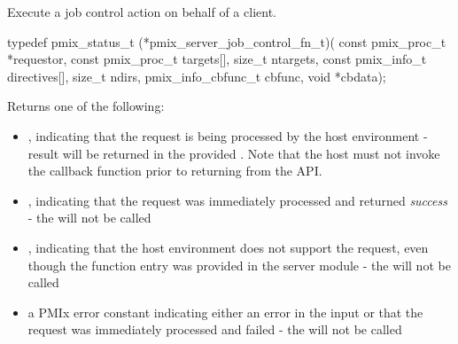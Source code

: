 \summary

Execute a job control action on behalf of a client.

\format

\cspecificstart
\begin{codepar}
typedef pmix_status_t (*pmix_server_job_control_fn_t)(
                             const pmix_proc_t *requestor,
                             const pmix_proc_t targets[],
                             size_t ntargets,
                             const pmix_info_t directives[],
                             size_t ndirs,
                             pmix_info_cbfunc_t cbfunc,
                             void *cbdata);
\end{codepar}
\cspecificend

\begin{arglist}
\end{arglist}

Returns one of the following:

\begin{itemize}
    \item {}, indicating that the request is being processed by the host environment - result will be returned in the provided . Note that the host must not invoke the callback function prior to returning from the \ac{API}.
    \item {}, indicating that the request was immediately processed and returned \textit{success} - the  will not be called
    \item {}, indicating that the host environment does not support the request, even though the function entry was provided in the server module - the  will not be called
    \item a PMIx error constant indicating either an error in the input or that the request was immediately processed and failed - the  will not be called
\end{itemize}

